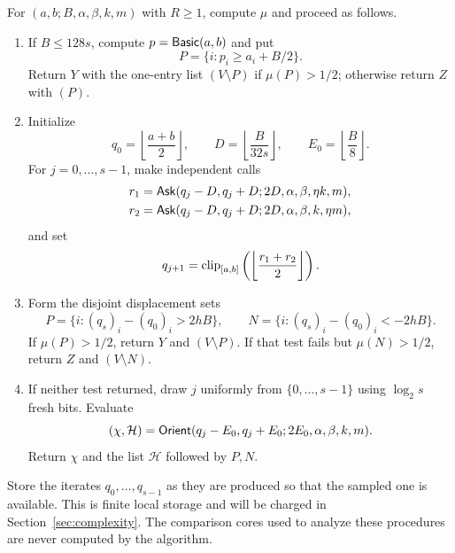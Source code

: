 \begin{procedure}[Orientation]\label{proc:orient}
For $(a,b;B,\alpha,\beta,k,m)$ with $R\ge1$, compute $\mu$ and proceed
as follows.
\begin{enumerate}[label=\textbf{O\arabic*.},ref=O\arabic*,leftmargin=*]
\item\label{alg:orient-base}
If $B\le128s$, compute $p=\mathsf{Basic}(a,b)$ and put
\[
 P=\{i:p_i\ge a_i+B/2\}.
\]
Return $Y$ with the one-entry list $(V\setminus P)$ if $\mu(P)>1/2$;
otherwise return $Z$ with $(P)$.

\item\label{alg:orient-loop}
Initialize
\[
 q_0=\left\lfloor\frac{a+b}{2}\right\rfloor,\qquad
 D=\left\lfloor\frac{B}{32s}\right\rfloor,\qquad
 E_0=\left\lfloor\frac B8\right\rfloor.
\]
For $j=0,\ldots,s-1$, make independent calls
\[
\begin{aligned}
 r_1&=\mathsf{Ask}(q_j-D,q_j+D;2D,\alpha,\beta,\eta k,m),\\
 r_2&=\mathsf{Ask}(q_j-D,q_j+D;2D,\alpha,\beta,k,\eta m),
\end{aligned}
\]
and set
\[
 q_{j+1}=\operatorname{clip}_{[a,b]}\left(\left\lfloor\frac{r_1+r_2}{2}\right\rfloor\right).
\]

\item\label{alg:orient-motion}
Form the disjoint displacement sets
\[
 P=\{i:(q_s)_i-(q_0)_i>2hB\},\qquad
 N=\{i:(q_s)_i-(q_0)_i<-2hB\}.
\]
If $\mu(P)>1/2$, return $Y$ and $(V\setminus P)$.
If that test fails but $\mu(N)>1/2$, return $Z$ and $(V\setminus N)$.

\item\label{alg:orient-child}
If neither test returned, draw $j$ uniformly from $\{0,\ldots,s-1\}$
using $\log_2s$ fresh bits. Evaluate
\[
 (\chi,\mathcal H)=
 \mathsf{Orient}(q_j-E_0,q_j+E_0;2E_0,\alpha,\beta,k,m).
\]
Return $\chi$ and the list $\mathcal H$ followed by $P,N$.
\end{enumerate}
\end{procedure}

Store the iterates $q_0,\ldots,q_{s-1}$ as they are produced so that the
sampled one is available. This is finite local storage and will be charged
in Section~\ref{sec:complexity}. The comparison cores used to analyze
these procedures are never computed by the algorithm.


